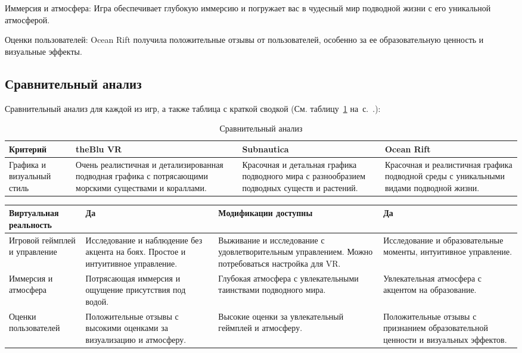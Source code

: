 \documentclass{../mirea-prog-lang}
\begin{document}
Иммерсия и атмосфера:
Игра обеспечивает глубокую иммерсию и погружает вас в чудесный мир подводной жизни с его уникальной атмосферой.

Оценки пользователей:
Ocean Rift получила положительные отзывы от пользователей, особенно за ее образовательную ценность и визуальные эффекты.

\subsection{Сравнительный анализ}

Сравнительный анализ для каждой из игр, а также таблица с краткой сводкой (См. таблицу~\ref{tab:1} на~с.~\pageref{tab:1}.):

\begin{table}[H]
	\caption{Сравнительный анализ}
	\centering
	\begin{tabular}{ |p{3cm}|p{4cm}|p{4cm}|p{4cm}| }
		\hline
		{Критерий} & {theBlu VR} & {Subnautica} & {Ocean Rift}\\ \hline
		
		{Графика и визуальный стиль} & {Очень реалистичная и детализированная подводная графика с потрясающими морскими существами и кораллами.} & {Красочная и детальная графика подводного мира с разнообразием подводных существ и растений.} & {Красочная и реалистичная графика подводной среды с уникальными видами подводной жизни.} \\ \hline
	\end{tabular}
	\label{tab:1}
\end{table}

\begin{table}[H]
	\begin{tabular}{ |p{2.75cm}|p{4.2cm}|p{4.2cm}|p{4.2cm}| }
		\hline
		{Виртуальная реальность} & {Да} & {Модификации доступны} & {Да} \\ \hline
		
		{Игровой геймплей и управление} & {Исследование и наблюдение без акцента на боях. Простое и интуитивное управление.} & {Выживание и исследование с удовлетворительным управлением. Можно потребоваться настройка для VR.} & {Исследование и образовательные моменты, интуитивное управление.} \\ \hline
		
		{Иммерсия и атмосфера} & {Потрясающая иммерсия и ощущение присутствия под водой.} & {Глубокая атмосфера с увлекательными таинствами подводного мира.} & {Увлекательная атмосфера с акцентом на образование.} \\ \hline
		
		{Оценки пользователей} & {Положительные отзывы с высокими оценками за визуализацию и атмосферу.} & {Высокие оценки за увлекательный геймплей и атмосферу.} & {Положительные отзывы с признанием образовательной ценности и визуальных эффектов.} \\ \hline
	\end{tabular}
\end{table}
\end{document}
